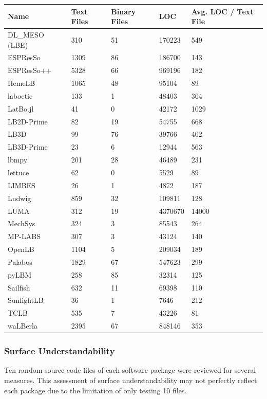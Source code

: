 \documentclass[12pt, notitlepage]{article}
\begin{document}
\begin{onehalfspacing}
	\begin{center}
		\begin{tabular}{ p{3.5cm}p{2cm}p{2.5cm}p{2cm}p{2.5cm} }
			\hline
			Name & Text Files & Binary Files & LOC & Avg. LOC / Text File\\
			\hline
			DL\_MESO (LBE) & 310 & 51 & 170223& 549\\
			ESPResSo &1309& 86 & 186700&143\\
			ESPResSo++ &5328& 66 & 969196&182\\
			HemeLB &1065& 48 & 95104&89\\
			laboetie &133& 1 & 48403&364\\		
			LatBo.jl &41& 0 & 42172&1029\\
			LB2D-Prime &82& 19 & 54755&668\\
			LB3D &99& 76 & 39766&402\\
			LB3D-Prime &23& 6 & 12944&563\\
			lbmpy&201&  28 & 46489  &231\\
			lettuce &62& 0 & 5529&89\\
			LIMBES &26& 1 & 4872&187\\
			Ludwig&859& 32 & 109811&128\\
			LUMA&312& 19 & 4370670&14000\\
			MechSys &324& 3 & 85543&264\\
			MP-LABS &307& 3 & 43124&140\\
			OpenLB &1104& 5 & 209034&189\\
			Palabos &1829& 67 & 547623&299\\
			pyLBM &258& 85& 32314&125\\
			Sailfish &632& 11 & 69398&110\\
			SunlightLB & 36& 1 & 7646& 212\\
			TCLB &535& 7 & 43226&81\\
			waLBerla & 2395 & 67 & 848146&353\\
			\hline
		\end{tabular}
		\label{moduledata}
	\end{center}
\end{onehalfspacing}

\subsubsection{Surface Understandability}

Ten random source code files of each software package were reviewed for several measures. This assessment of surface understandability may not perfectly reflect each package due to the limitation of only testing 10 files. 
\end{document}
